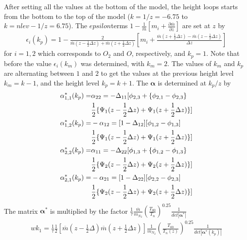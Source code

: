 After setting all the values at the bottom of the model, the height
loops starts from the bottom to the top of the model ($k=1/ z=
-6.75$ to $k = nlev-1 / z= 6.75$). The $epsilon $terms $1-
\frac{1}{\overline{m}}[{m_i} + \frac{\partial \overline{m}}{\partial
z}]$ are set at $z$ by
%
\begin{align}
   \epsilon_{i}(k_p) = 1- \frac{2}{\overline{m}(z- \frac{1}{2} \Delta z) +
       \overline{m}(z+\frac{1}{2}\Delta z)}[{m_i} +
     \frac{\overline{m}(z+\frac{1}{2}\Delta z) -
      \overline{m}(z-\frac{1}{2}\Delta z)}{\Delta z}]
\end{align}
%
for $i = 1, 2$ which corresponds to $O_2$ and $O$, respectively, and
$k_p = 1$. Note that before the value $\epsilon_{i}(k_m)$ was
determined, with $k_m = 2$. The values of $k_m$ and $k_p$ are
alternating between $1$ and $2$ to get the values at the previous
height level $k_m= k-1$, and the height level $k_p = k+1$. The
$\mathbf{\alpha}$ is determined at $k_p / z$ by
%
\begin{align}
   \alpha^*_{1,1}(k_p) = & \alpha_{22} = -\Delta_{11}[\phi_{2,3}+\{\phi_{2,1}-\phi_{2,3}\} \notag \\
                         & \frac{1}{2} \{ \Psi_1(z-\frac{1}{2}\Delta z) + \Psi_1(z+\frac{1}{2}\Delta
                         z)\}] \\
   \alpha^*_{1,2}(k_p) = & -\alpha_{12} = [1-\Delta_{12}][\phi_{1,2}- \phi_{1,3}] \notag \\
                         & \frac{1}{2} \{ \Psi_1(z-\frac{1}{2}\Delta z) + \Psi_1(z+\frac{1}{2}\Delta
                         z)\}] \\
   \alpha^*_{2,2}(k_p) = & \alpha_{11} = -\Delta_{22}[\phi_{1,3}+\{\phi_{1,2}-\phi_{1,3}\} \notag \\
                         & \frac{1}{2} \{ \Psi_2(z-\frac{1}{2}\Delta z) + \Psi_2(z+\frac{1}{2}\Delta
                         z)\}] \\
   \alpha^*_{2,1}(k_p) = & -\alpha_{21} = [1-\Delta_{22}][\phi_{2,2}- \phi_{2,3}] \notag \\
                         & \frac{1}{2} \{ \Psi_2(z-\frac{1}{2}\Delta z) + \Psi_2(z+\frac{1}{2}\Delta z)\}]
\end{align}
%
The matrix $\mathbf{\alpha}^{*}$ is multiplied by the factor
$\frac{1}{\tau} \frac{\overline{m}}{m_{N_2}}\left(
\frac{T_{00}}{T_n}\right)^{0.25}\frac{1}{det|\mathbf{\alpha}^*|}$
%
\begin{align}
   wk_1 = \frac{1}{\tau}\frac{1}{2} [\overline{m}(z- \frac{1}{2}\Delta )\overline{m}(z+\frac{1}{2}\Delta z)]
   \frac{1}{m_{N_2}}\left(
\frac{T_{00}}{T_n(z)}\right)^{0.25}\frac{1}{det|\mathbf{\alpha}^*(k_p)|}
\end{align}
